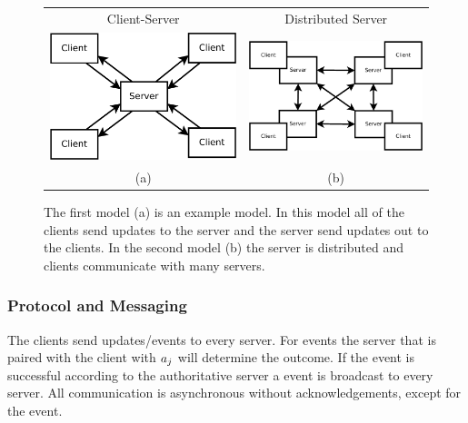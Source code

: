 	\begin{figure}[ht]
	\centering
	\begin{tabular}{c c}
		Client-Server & Distributed Server \\
		\includegraphics[width=0.44\linewidth]{../images/client-server-model-crop.pdf} &
		\includegraphics[width=0.48\linewidth]{../images/client-distributed-server-model-crop.pdf} \\
		(a) & (b)
	\end{tabular}

	\caption{\label{figure:server-models} The first model (a) is an example \clientServer model. In this model all of the clients send updates to the server and the server send updates out to the clients. In the second model (b) the server is distributed and clients communicate with many servers.}
	\end{figure}
	
	\subsubsection{Protocol and Messaging}
	
	The clients send updates/events to every server. For  events the server that is paired with the client with $a_{j}$ will determine the outcome. If the  event is successful according to the authoritative server a  event is broadcast to every server. All communication is asynchronous without acknowledgements, except for the  event.

